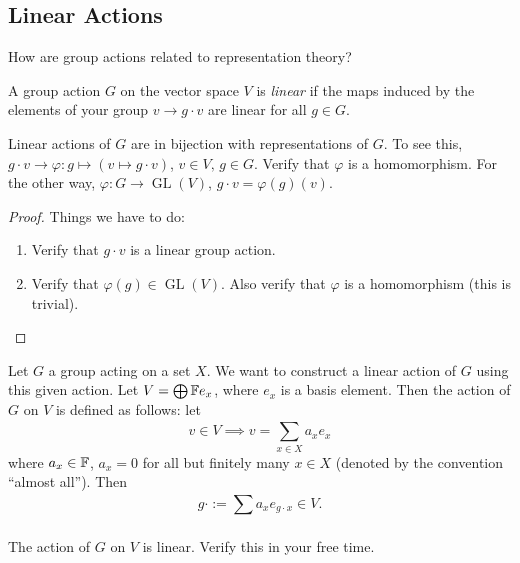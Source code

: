 \subsection{Linear Actions}
How are group actions related to representation theory?
\begin{definition}
   A group action $G$ on the vector space $V$ is \emph{linear} if the maps induced by the elements of your group $v\to g\cdot v$ are linear for all $g\in G$.
\end{definition}
\begin{prop}
    Linear actions of $G$ are in bijection with representations of $G$. To see this, $g\cdot v \longrightarrow \varphi \colon g\mapsto (v\mapsto g\cdot v)$, $v\in V,\,g\in G$. Verify that $\varphi $ is a homomorphism. For the other way, $\varphi \colon G \to \operatorname{GL}(V)$, $g\cdot v=\varphi (g)(v)$.
\end{prop}
\begin{proof}
   Things we have to do:
   \begin{enumerate}
       \item Verify that $g\cdot v$ is a linear group action.
       \item Verify that $\varphi (g)\in \operatorname{GL}(V)$. Also verify that $\varphi $ is a homomorphism (this is trivial).
   \end{enumerate}
\end{proof}
Let $G$ a group acting on a set $X$. We want to construct a linear action of $G$ using this given action. Let $V=\bigoplus\mathbb{F} e_x$, where $e_x$ is a basis element. Then the action of $G$ on $V$ is defined as follows: let \[
v\in V\implies v=\sum_{x\in X}^{} a_x e_x
\] where $a_x\in \mathbb{F}$, $a_x=0$ for all but finitely many $x\in X$ (denoted by the convention ``almost all''). Then \[
g\cdot := \sum_{}^{} a_x e_{g\cdot x}\in V.
\] 
\begin{claim}
    The action of $G$ on $V$ is linear. Verify this in your free time.
\end{claim}

